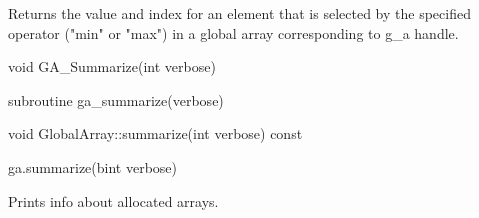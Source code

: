 \documentclass[10pt]{article}
\begin{document}
\gcoll

\begin{desc}

Returns the value and index for an element that is selected by the specified
operator ("min" or "max") in a global array corresponding to g_a handle.

\end{desc}


\begin{capi}
\begin{ccode}
void GA_Summarize(int verbose)
\end{ccode}
\begin{funcargs}
\end{funcargs}
\end{capi}

\begin{fapi}
\begin{fcode}
subroutine ga_summarize(verbose)
\end{fcode}
\begin{funcargs}
\end{funcargs}
\end{fapi}

\begin{cxxapi}
\begin{cxxcode}
void GlobalArray::summarize(int verbose) const
\end{cxxcode}
\begin{funcargs}
\end{funcargs}
\end{cxxapi}

\begin{pyapi}
\begin{pycode}
ga.summarize(bint verbose)
\end{pycode}
\begin{funcargs}
\end{funcargs}
\end{pyapi}

\local

\begin{desc}
Prints info about allocated arrays.
\end{desc}


\end{document}
